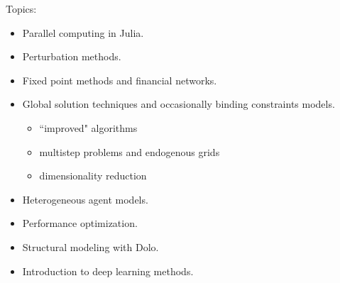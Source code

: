 \documentclass[12pt]{article}
\begin{document}
Topics:
%
\begin{itemize}
    \item Parallel computing in Julia.
    \item Perturbation methods.
    \item Fixed point methods and financial networks.
    \item Global solution techniques and occasionally binding constraints models.
    \begin{itemize}
        \item ``improved" algorithms
        \item multistep problems and endogenous grids
        \item dimensionality reduction
    \end{itemize}
    \item Heterogeneous agent models.
    \item Performance optimization.
    \item Structural modeling with Dolo.
    \item Introduction to deep learning methods.
\end{itemize}
\end{document}
